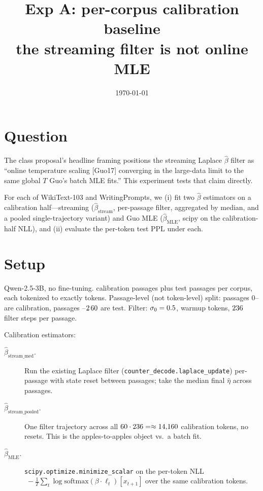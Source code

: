 \documentclass[11pt]{article}
\title{Exp A: per-corpus calibration baseline\\
       the streaming filter is not online MLE}
\author{}
\date{\today}
\begin{document}
\maketitle

\section{Question}

The class proposal's headline framing positions the streaming Laplace
$\hat\beta$ filter as ``online temperature scaling [Guo17] converging in the
large-data limit to the same global $T$ Guo's batch MLE fits.''  This
experiment tests that claim directly.

For each of WikiText-103 and WritingPrompts, we (i) fit two
$\hat\beta$ estimators on a calibration half---streaming
($\hat\beta_{\mathrm{stream}}$, per-passage filter, aggregated by median, and
a pooled single-trajectory variant) and Guo MLE
($\hat\beta_{\mathrm{MLE}}$, scipy on the calibration-half NLL), and
(ii) evaluate the per-token test PPL under each.

\section{Setup}

Qwen-2.5-3B, no fine-tuning. \calNcal{} calibration passages plus
\calNtest{} test passages per corpus, each tokenized to exactly
\calLength{} tokens. Passage-level (not token-level) split: passages
0--\calNcal{} are calibration, passages \calNcal{}--$2\,60$ are test.
Filter: $\sigma_0 = 0.5$, warmup \calWarmup{} tokens, $236$
filter steps per passage.

Calibration estimators:
\begin{description}
\item[$\hat\beta_{\mathrm{stream\_med}}$.] Run the existing Laplace filter
(\texttt{counter\_decode.laplace\_update}) per-passage with state reset
between passages; take the median final $\hat\eta$ across passages.
\item[$\hat\beta_{\mathrm{stream\_pooled}}$.] One filter trajectory across all
$60 \cdot 236 = \approx 14{,}160$ calibration tokens, no resets.
This is the apples-to-apples object vs.\ a batch fit.
\item[$\hat\beta_{\mathrm{MLE}}$.] \texttt{scipy.optimize.minimize\_scalar} on
the per-token NLL
$\;-\tfrac{1}{T}\sum_t \log\mathrm{softmax}(\beta\cdot\ell_t)[x_{t+1}]$
over the same calibration tokens.
\end{description}
\end{document}
